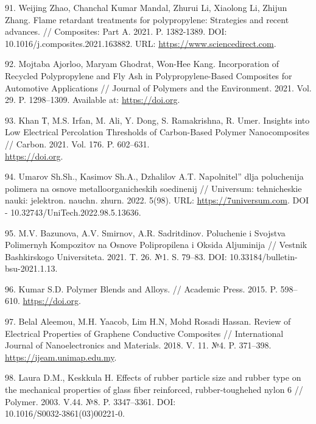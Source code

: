 \begin{references}
91. Weijing Zhao, Chanchal Kumar Mandal, Zhurui Li, Xiaolong Li,
Zhijun Zhang. Flame retardant treatments for polypropylene: Strategies
and recent advances. // Composites: Part A. 2021. P. 1382-1389. DOI:
10.1016/j.composites.2021.163882. URL: \href{https://www.sciencedirect.com/science/article/abs/pii/S1359836821001219}{https://www.sciencedirect.com}.

92. Mojtaba Ajorloo, Maryam Ghodrat, Won-Hee Kang. Incorporation of
Recycled Polypropylene and Fly Ash in Polypropylene-Based Composites
for Automotive Applications // Journal of Polymers and the
Environment. 2021. Vol. 29. P. 1298–1309. Available
at: \href{https://doi.org/10.1007/s10924-020-01961-y}{https://doi.org}.

93. Khan Т, M.S. Irfan, M. Ali, Y. Dong, S. Ramakrishna,
R. Umer. Insights into Low Electrical Percolation Thresholds of
Carbon-Based Polymer Nanocomposites //
Carbon. 2021. Vol. 176. P. 602–631. \\\href{https://doi.org/10.1016/j.carbon.2021.01.158}{https://doi.org}.

94. Umarov Sh.Sh., Kasimov Sh.A., Dzhalilov A.T. Napolnitel'' dlja
poluchenija polimera na osnove metalloorganicheskih soedinenij //
Universum: tehnicheskie nauki:
jelektron. nauchn. zhurn. 2022. 5(98). URL: \href{https://7universum.com/ru/tech/archive/item/13636}{https://7universum.com}. DOI
- 10.32743/UniTech.2022.98.5.13636.

95. M.V. Bazunova, A.V. Smirnov, A.R. Sadritdinov. Poluchenie i
Svojstva Polimernyh Kompozitov na Osnove Polipropilena i Oksida
Aljuminija // Vestnik Bashkirskogo
Universiteta. 2021. T. 26. №1. S. 79–83. DOI:
10.33184/bulletin-bsu-2021.1.13.

96. Kumar S.D. Polymer Blends and Alloys. // Academic
Press. 2015. P. 598–610. \href{https://doi.org/10.1080/02670844.2021.1967024}{https://doi.org}.

97. Belal Aleemou, M.H. Yaacob, Lim H.N, Mohd Rosadi Hassan. Review of
Electrical Properties of Graphene Conductive Composites //
International Journal of Nanoelectronics and
Materials. 2018. V. 11. №4. P. 371–398.
\href{https://ijeam.unimap.edu.my/images/PDF/IJNEAM\%20No.\%204\%202018\%20OCT/Vol_11_No_4_2018_1_371-398}{https://ijeam.unimap.edu.my}.

98. Laura D.M., Keskkula H. Effects of rubber particle size and rubber
type on the mechanical properties of glass fiber reinforced,
rubber-toughehed nylon 6 //
Polymer. 2003. V.44. №8. P. 3347–3361. DOI: \\10.1016/S0032-3861(03)00221-0.


\end{references}
